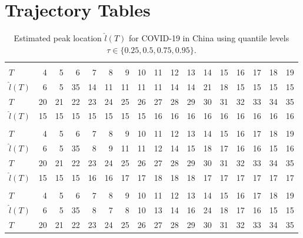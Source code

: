\documentclass[12pt,a4paper]{article}
\begin{document}
\appendix
\section{Trajectory Tables}
\label{app:trajectories}

\begin{landscape}
	\begin{table}[htbp]
		\caption{Estimated peak location $\hat{l}(T)$ for COVID-19 in China using quantile levels $\tau\in\{0.25,0.5,0.75,0.95\}$.}
		\label{tab:china_tau}
		\begin{tabular*}{\linewidth}{@{\extracolsep{\fill}}lrrrrrrrrrrrrrrrr}
			\toprule
			\addlinespace[2.5pt]
			\multicolumn{17}{c}{\textbf{$\tau=0.25,\ T_{\mathrm{stab}}=15,\ \varepsilon=3$}} \\
			\addlinespace[2.5pt]
			\midrule
			$T$ & 4 & 5 & 6 & 7 & 8 & 9 & 10 & 11 & 12 & 13 & 14 & 15 & 16 & 17 & 18 & 19 \\
			$\hat{l}(T)$ & 6 & 5 & 35 & 14 & 11 & 11 & 11 & 11 & 14 & 14 & 21 & 18 & 15 & 15 & 15 & 15 \\
			$T$ & 20 & 21 & 22 & 23 & 24 & 25 & 26 & 27 & 28 & 29 & 30 & 31 & 32 & 33 & 34 & 35 \\
			$\hat{l}(T)$ & 15 & 15 & 15 & 15 & 15 & 15 & 15 & 16 & 16 & 16 & 16 & 16 & 16 & 16 & 16 & 16 \\
			\midrule\addlinespace[2.5pt]
			\multicolumn{17}{c}{\textbf{$\tau=0.5,\ T_{\mathrm{stab}}=13,\ \varepsilon=3$}} \\
			\addlinespace[2.5pt]
			\midrule
			$T$ & 4 & 5 & 6 & 7 & 8 & 9 & 10 & 11 & 12 & 13 & 14 & 15 & 16 & 17 & 18 & 19 \\
			$\hat{l}(T)$ & 6 & 5 & 35 & 8 & 9 & 11 & 11 & 12 & 14 & 15 & 18 & 17 & 16 & 16 & 15 & 16 \\
			$T$ & 20 & 21 & 22 & 23 & 24 & 25 & 26 & 27 & 28 & 29 & 30 & 31 & 32 & 33 & 34 & 35 \\
			$\hat{l}(T)$ & 15 & 15 & 15 & 16 & 16 & 17 & 17 & 18 & 18 & 18 & 17 & 17 & 17 & 17 & 17 & 17 \\
			\midrule\addlinespace[2.5pt]
			\multicolumn{17}{c}{\textbf{$\tau=0.75,\ T_{\mathrm{stab}}=23,\ \varepsilon=3$}} \\
			\addlinespace[2.5pt]
			\midrule
			$T$ & 4 & 5 & 6 & 7 & 8 & 9 & 10 & 11 & 12 & 13 & 14 & 15 & 16 & 17 & 18 & 19 \\
			$\hat{l}(T)$ & 6 & 5 & 35 & 8 & 7 & 8 & 10 & 13 & 14 & 16 & 24 & 18 & 17 & 16 & 15 & 15 \\
			$T$ & 20 & 21 & 22 & 23 & 24 & 25 & 26 & 27 & 28 & 29 & 30 & 31 & 32 & 33 & 34 & 35 \\

\end{tabular*}
\end{table}
\end{landscape}
\end{document}

